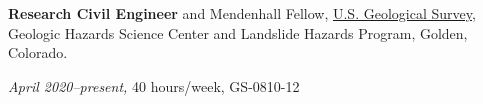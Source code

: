 \documentclass[10pt]{article}
\begin{document}

\textbf{Research Civil Engineer} and Mendenhall Fellow, \href{https://www.usgs.gov}{{U.S. Geological Survey}}, Geologic Hazards Science Center and Landslide Hazards Program, Golden, Colorado. 

\textit{April 2020--present,} 40 hours/week, GS-0810-12
\end{document}
